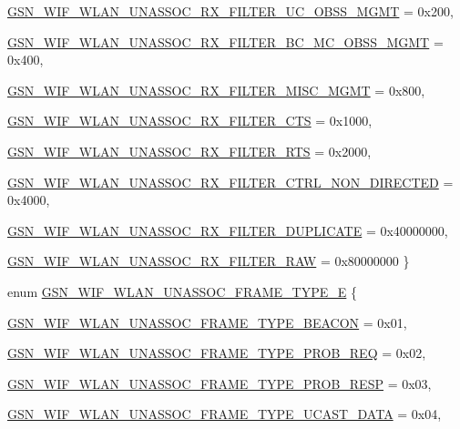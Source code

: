 \begin{DoxyCompactItemize}
\par
\hyperlink{a00677_gaca8dae165f1024726492234d64d1bb26ace06f12ab143951f3076cfda0d554341}{GSN\_\-WIF\_\-WLAN\_\-UNASSOC\_\-RX\_\-FILTER\_\-UC\_\-OBSS\_\-MGMT} =  0x200, 
\par
\hyperlink{a00677_gaca8dae165f1024726492234d64d1bb26a5814545b64e9edfc82e6cce14fac088e}{GSN\_\-WIF\_\-WLAN\_\-UNASSOC\_\-RX\_\-FILTER\_\-BC\_\-MC\_\-OBSS\_\-MGMT} =  0x400, 
\par
\hyperlink{a00677_gaca8dae165f1024726492234d64d1bb26a658f0029149502ff6d88746d1155a062}{GSN\_\-WIF\_\-WLAN\_\-UNASSOC\_\-RX\_\-FILTER\_\-MISC\_\-MGMT} =  0x800, 
\par
\hyperlink{a00677_gaca8dae165f1024726492234d64d1bb26ae2133c9d5f0e354b2c1f5a183f6129ba}{GSN\_\-WIF\_\-WLAN\_\-UNASSOC\_\-RX\_\-FILTER\_\-CTS} =  0x1000, 
\par
\hyperlink{a00677_gaca8dae165f1024726492234d64d1bb26aec9ffc7f5bbdc50dca13a4382ebc1a81}{GSN\_\-WIF\_\-WLAN\_\-UNASSOC\_\-RX\_\-FILTER\_\-RTS} =  0x2000, 
\par
\hyperlink{a00677_gaca8dae165f1024726492234d64d1bb26a3ea1089bab7a8123f711759e4b661d9c}{GSN\_\-WIF\_\-WLAN\_\-UNASSOC\_\-RX\_\-FILTER\_\-CTRL\_\-NON\_\-DIRECTED} =  0x4000, 
\par
\hyperlink{a00677_gaca8dae165f1024726492234d64d1bb26af4182fe03c8de0039a5d969b5cae2b42}{GSN\_\-WIF\_\-WLAN\_\-UNASSOC\_\-RX\_\-FILTER\_\-DUPLICATE} = 0x40000000, 
\par
\hyperlink{a00677_gaca8dae165f1024726492234d64d1bb26ac5a49e97e8e97f7b2f944afa1e32e4a7}{GSN\_\-WIF\_\-WLAN\_\-UNASSOC\_\-RX\_\-FILTER\_\-RAW} = 0x80000000
 \}
\item 
enum \hyperlink{a00677_ga1b471d184450287e7d0cec7c8d0c4639}{GSN\_\-WIF\_\-WLAN\_\-UNASSOC\_\-FRAME\_\-TYPE\_\-E} \{ \par
\hyperlink{a00677_ga1b471d184450287e7d0cec7c8d0c4639aab34b890bb27dc08cb9c1b0f33ea7564}{GSN\_\-WIF\_\-WLAN\_\-UNASSOC\_\-FRAME\_\-TYPE\_\-BEACON} =  0x01, 
\par
\hyperlink{a00677_ga1b471d184450287e7d0cec7c8d0c4639a14f107c01f736ddedcebff845ac17594}{GSN\_\-WIF\_\-WLAN\_\-UNASSOC\_\-FRAME\_\-TYPE\_\-PROB\_\-REQ} =  0x02, 
\par
\hyperlink{a00677_ga1b471d184450287e7d0cec7c8d0c4639aea63f6ae58aad67b3270c05bbefdc3c2}{GSN\_\-WIF\_\-WLAN\_\-UNASSOC\_\-FRAME\_\-TYPE\_\-PROB\_\-RESP} =  0x03, 
\par
\hyperlink{a00677_ga1b471d184450287e7d0cec7c8d0c4639a65dfdef0f47d5b5d7853f6aebffa050f}{GSN\_\-WIF\_\-WLAN\_\-UNASSOC\_\-FRAME\_\-TYPE\_\-UCAST\_\-DATA} =  0x04, 

\end{DoxyCompactItemize}
